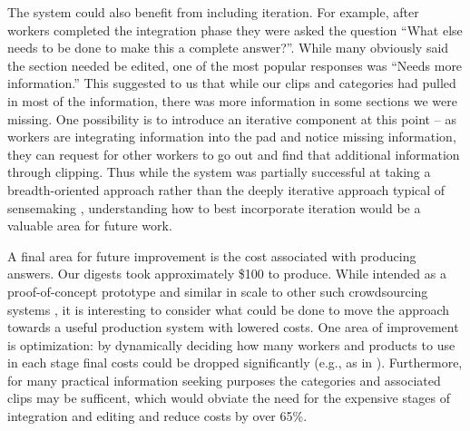 
The system could also benefit from including iteration. For example, after workers completed the integration phase they were asked the question ``What else needs to be done to make this a complete answer?''. While many obviously said the section needed be edited, one of the most popular responses was ``Needs more information.'' This suggested to us that while our clips and categories had pulled in most of the information, there was more information in some sections we were missing. One possibility is to introduce an iterative component at this point -- as workers are integrating information into the pad and notice missing information, they can request for other workers to go out and find that additional information through clipping. %
Thus while the system was partially successful at taking a breadth-oriented approach rather than the deeply iterative approach typical of sensemaking \cite{dervin1983overview, dervin1998sense,pirolli1999information,Russell:1993:CSS:169059.169209}, understanding how to best incorporate iteration would be a valuable area for future work.

A final area for future improvement is the cost associated with producing answers. Our digests took approximately \$100 to produce. While intended as a proof-of-concept prototype and similar in scale to other such crowdsourcing systems \cite{andre2014crowd,Chilton:2013:CCT:2470654.2466265}, it is interesting to consider what could be done to move the approach towards a useful production system with lowered costs. One area of improvement is optimization: by dynamically deciding how many workers and products to use in each stage final costs could be dropped significantly (e.g., as in \cite{Kamar:2012:CHM:2343576.2343643}). Furthermore, for many practical information seeking purposes the categories and associated clips may be sufficent, which would obviate the need for the expensive stages of integration and editing and reduce costs by over 65\%. 

